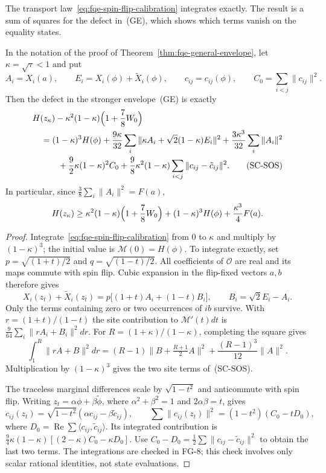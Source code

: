The transport law~\eqref{eq:fqe-spin-flip-calibration} integrates exactly. The result is a sum of squares for the defect
in~(GE), which shows which terms vanish on the equality states.

\begin{proposition}
\label{prop:fqe-spin-flip-calibration}
In the notation of the proof of Theorem~\ref{thm:fqe-general-envelope}, let $\kappa=\sqrt\tau<1$ and put
\[
 A_i=X_i(a),\qquad E_i=X_i(\phi)+\tilde X_i(\phi),\qquad
 c_{ij}=c_{ij}(\phi),\qquad C_0=\sum_{i<j}\|c_{ij}\|^2.
\]
Then the defect in the stronger envelope~(GE) is exactly
\begin{align}
&H(z_\kappa)-\kappa^2(1-\kappa)\Bigl(1+\frac78W_0\Bigr)\notag\\
&\quad=(1-\kappa)^3H(\phi)
 +\frac{9\kappa}{32}\sum_i\|\kappa A_i+\sqrt2(1-\kappa)E_i\|^2
 +\frac{3\kappa^3}{32}\sum_i\|A_i\|^2\notag\\
&\qquad\quad+\frac92\kappa(1-\kappa)^2C_0
 +\frac98\kappa^2(1-\kappa)\sum_{i<j}\|c_{ij}-\tilde c_{ij}\|^2.
\tag{SC-SOS}\label{eq:fqe-spin-flip-calibration-sos}
\end{align}
In particular, since $\frac38\sum_i\|A_i\|^2=F(a)$,
\[
 H(z_\kappa)\ge \kappa^2(1-\kappa)\Bigl(1+\frac78W_0\Bigr)
                 +(1-\kappa)^3H(\phi)+\frac{\kappa^3}{4}F(a).
\]
\end{proposition}
\begin{proof}
Integrate~\eqref{eq:fqe-spin-flip-calibration} from $0$ to $\kappa$ and multiply by $(1-\kappa)^3$; the initial value is
$\mathcal M(0)=H(\phi)$. To integrate exactly, set $p=\sqrt{(1+t)/2}$ and $q=\sqrt{(1-t)/2}$.
All coefficients of $\mathcal O$ are real and its maps commute with
spin flip. Cubic expansion in the flip-fixed vectors $a,b$ therefore gives
\[
 X_i(z_t)+\tilde X_i(z_t)
 =p\bigl[(1+t)A_i+(1-t)B_i\bigr],\qquad
 B_i=\sqrt2 E_i-A_i.
\]
Only the terms containing zero or two occurrences of $ib$ survive.
With $r=(1+t)/(1-t)$ the site contribution to $\mathcal M'(t)dt$ is
$\frac9{64}\sum_i\|rA_i+B_i\|^2dr$.
For $R=(1+\kappa)/(1-\kappa)$, completing the square gives
\[
 \int_1^R\|rA+B\|^2dr
 =(R-1)\|B+\tfrac{R+1}{2}A\|^2
       +\frac{(R-1)^3}{12}\|A\|^2.
\]
Multiplication by $(1-\kappa)^3$ gives the two site terms of~(SC-SOS).

The traceless marginal differences scale by $\sqrt{1-t^2}$ and
anticommute with spin flip. Writing $z_t=\alpha\phi+\beta\tilde\phi$,
where $\alpha^2+\beta^2=1$ and $2\alpha\beta=t$, gives
\[
 c_{ij}(z_t)=\sqrt{1-t^2}(\alpha c_{ij}-\beta\tilde c_{ij}),\qquad
 \sum\|c_{ij}(z_t)\|^2=(1-t^2)(C_0-tD_0),
\]
where $D_0=\operatorname{Re}\sum\langle c_{ij},\tilde c_{ij}\rangle$.
Its integrated contribution is
$\frac94\kappa(1-\kappa)[(2-\kappa)C_0-\kappa D_0]$.
Use $C_0-D_0=\frac12\sum\|c_{ij}-\tilde c_{ij}\|^2$ to obtain the last
two terms. The integrations are checked in FG-8; this
check involves only scalar rational identities, not state evaluations.
\end{proof}
